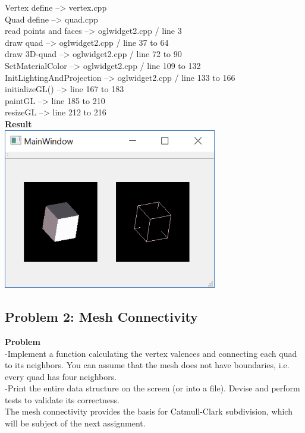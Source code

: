 \documentclass[12pt,a4paper]{scrartcl}
\begin{document}
Vertex define --> vertex.cpp\\
Quad define --> quad.cpp\\
read points and faces --> oglwidget2.cpp / line 3\\
draw quad --> oglwidget2.cpp / line 37 to 64\\
draw 3D-quad --> oglwidget2.cpp / line 72 to 90\\
SetMaterialColor --> oglwidget2.cpp / line 109 to 132\\
InitLightingAndProjection --> oglwidget2.cpp / line 133 to 166\\
initializeGL() --> line 167 to 183\\
paintGL --> line 185 to 210\\
resizeGL --> line 212 to 216 \\[0,5cm]



\textbf{Result}\\

\includegraphics[width=0.7\textwidth]{Problem 1.png}\\

\subsection{Problem 2: Mesh Connectivity}

\large
\textbf{Problem}\\
-Implement a function calculating the vertex valences and connecting each quad to its neighbors.
You can assume that the mesh does not have boundaries, i.e. every quad has four neighbors.\\
-Print the entire data structure on the screen (or into a file). Devise and perform tests to validate
its correctness.\\
The mesh connectivity provides the basis for Catmull-Clark subdivision, which will be subject of the
next assignment.\\[0,5cm]
\end{document}
